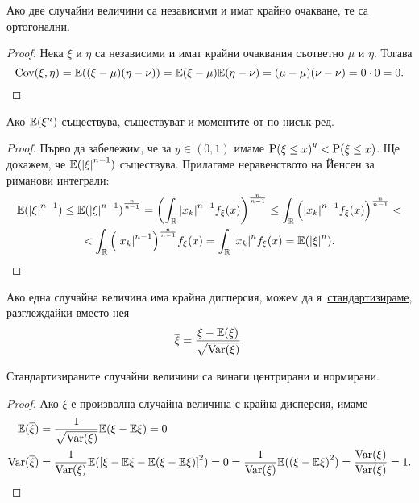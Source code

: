 \documentclass[numbers=endperiod, DIV=15, bibliography=totocnumbered]{scrartcl}
\begin{document}
\begin{proposition}\label{thm:orthogonal-if-independent}
  Ако две случайни величини са независими и имат крайно очакване, те са ортогонални.
\end{proposition}
\begin{proof}
  Нека $\xi$ и $\eta$ са независими и имат крайни очаквания съответно $\mu$ и $\eta$. Тогава
  \begin{displaymath}
    \operatorname{Cov}(\xi, \eta)
    =
    \mathbb{E}((\xi - \mu) (\eta - \nu))
    =
    \mathbb{E}(\xi - \mu) \mathbb{E}(\eta - \nu)
    =
    (\mu - \mu) (\nu - \nu)
    =
    0 \cdot 0
    =
    0.
  \end{displaymath}
\end{proof}

\begin{proposition}\label{thm:lower-order-moments}
  Ако $\mathbb{E}(\xi^n)$ съществува, съществуват и моментите от по-нисък ред.
\end{proposition}
\begin{proof}
  Първо да забележим, че за $y \in (0, 1)$ имаме ${\operatorname{P}(\xi \leq x)}^y < \operatorname{P}(\xi \leq x)$. Ще докажем, че $\mathbb{E}({\left\vert \xi \right\vert}^{n-1})$ съществува. Прилагаме неравенството на Йенсен за риманови интеграли:
  \begin{multline*}
    \mathbb{E}({\left\vert \xi \right\vert}^{n-1})
    \leq
    {\mathbb{E}({\left\vert \xi \right\vert}^{n-1})}^{\frac n {n-1}}
    =
    {\left( \int_{\mathbb{R}} {\left\vert x_k \right\vert}^{n-1} f_\xi(x) \right)}^{\frac n {n-1}}
    \leq
    \int_{\mathbb{R}} {\left({\left\vert x_k \right\vert}^{n-1} f_\xi(x) \right)}^{\frac n {n-1}}
    < \\ <
    \int_{\mathbb{R}} {\left({\left\vert x_k \right\vert}^{n-1}\right)}^{\frac n {n-1}} f_\xi(x)
    =
    \int_{\mathbb{R}} {\left\vert x_k \right\vert}^n f_\xi(x)
    =
    \mathbb{E}({\left\vert \xi \right\vert}^n).
  \end{multline*}
\end{proof}

\begin{definition}
  Ако една случайна величина има крайна дисперсия, можем да я~\uline{стандартизираме}, разглеждайки вместо нея
  \begin{displaymath}
    \overline \xi = \frac {\xi - \mathbb{E}(\xi)} {\sqrt{\operatorname{Var}(\xi)}}.
  \end{displaymath}
\end{definition}

\begin{proposition}
  Стандартизираните случайни величини са винаги центрирани и нормирани.
\end{proposition}
\begin{proof}
  Ако $\xi$ е произволна случайна величина с крайна дисперсия, имаме
  \begin{align*}
    \mathbb{E}(\overline \xi)
    &=
    \frac 1 {\sqrt{\operatorname{Var}(\xi)}} \mathbb{E}(\xi - \mathbb{E}\xi)
    =
    0
    \\
    \operatorname{Var}(\overline \xi)
    &=
    \frac 1 {\operatorname{Var}(\xi)} \mathbb{E}({\left[ \xi - \mathbb{E}\xi - \mathbb{E}(\xi - \mathbb{E}\xi) \right]}^2) = 0
    =
    \frac 1 {\operatorname{Var}(\xi)} \mathbb{E}({(\xi - \mathbb{E}\xi)}^2)
    =
    \frac {\operatorname{Var}(\xi)} {\operatorname{Var}(\xi)}
    =
    1.
  \end{align*}
\end{proof}
\end{document}
